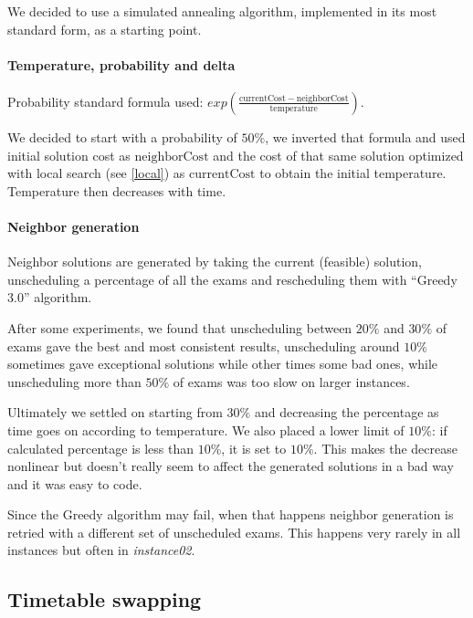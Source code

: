 \documentclass[11pt, a4paper, leqno]{article}
\begin{document}
	We decided to use a simulated annealing algorithm, implemented in its most standard form, as a starting point.
	
	\paragraph{Temperature, probability and delta}
	
	Probability standard formula used: $exp\left(\frac{\mathrm{currentCost}-\mathrm{neighborCost}}{\mathrm{temperature}}\right)$.
	
	We decided to start with a probability of $50\%$, we inverted that formula and used initial solution cost as $\mathrm{neighborCost}$ and the cost of that same solution optimized with local search (see \ref{local}) as $\mathrm{currentCost}$ to obtain the initial temperature. Temperature then decreases with time.
	
	\paragraph{Neighbor generation}
	\label{neighbors}
	
	Neighbor solutions are generated by taking the current (feasible) solution, unscheduling a percentage of all the exams and rescheduling them with ``Greedy 3.0'' algorithm.
	
	After some experiments, we found that unscheduling between $20\%$ and $30\%$ of exams gave the best and most consistent results, unscheduling around $10\%$ sometimes gave exceptional solutions while other times some bad ones, while unscheduling more than $50\%$ of exams was too slow on larger instances.
	
	Ultimately we settled on starting from $30\%$ and decreasing the percentage as time goes on according to temperature. We also placed a lower limit of $10\%$: if calculated percentage is less than $10\%$, it is set to $10\%$. This makes the decrease nonlinear but doesn't really seem to affect the generated solutions in a bad way and it was easy to code.
	
	Since the Greedy algorithm may fail, when that happens neighbor generation is retried with a different set of unscheduled exams. This happens very rarely in all instances but often in \textit{instance02}.
	
	\subsection{Timetable swapping}
	
\end{document}
